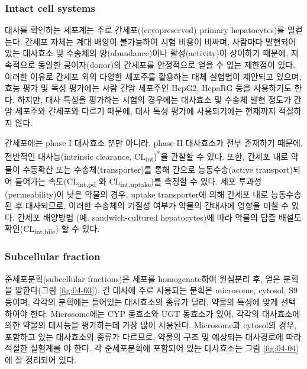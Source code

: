 \documentclass[
  11pt,
  krantz2, a4paper, twoside]{krantz}
\begin{document}
\subsubsection{Intact cell systems}\label{intact-cell-systems}

대사를 확인하는 세포계는 주로 간세포((cryopreserved) primary
hepatocytes)를 일컫는다. 간세포 자체는 계대 배양이 불가능하여 시험
비용이 비싸며, 사람마다 발현되어 있는 대사효소 및 수송체의
양(abundance)이나 활성(activity)이 상이하기 때문에, 지속적으로 동일한
공여자(donor)의 간세포를 안정적으로 얻을 수 없는 제한점이 있다. 이러한
이유로 간세포 외의 다양한 세포주를 활용하는 대체 실험법이 제안되고
있으며, 효능 평가 및 독성 평가에는 사람 간암 세포주인 HepG2, HepaRG 등을
사용하기도 한다. 하지만, 대사 특성을 평가하는 시험의 경우에는 대사효소
및 수송체 발현 정도가 간암 세포주와 간세포와 다르기 때문에, 대사 특성
평가에 사용되기에는 현재까지 적절하지 않다.

간세포에는 phase I 대사효소 뿐만 아니라, phase II 대사효소가 전부
존재하기 때문에, 전반적인 대사능(intrinsic clearance, CL\textsubscript{int})\textsuperscript{*}을
관찰할 수 있다. 또한, 간세포 내로 약물이 수동확산 또는
수송체(transporter)를 통해 간으로 능동수송(active transport)되어
들어가는 속도(CL\textsubscript{int,pd} 와 CL\textsubscript{int,uptake})를 측정할 수 있다. 세포
투과성(permeability)이 낮은 약물의 경우, uptake transporter에 의해
간세포 내로 능동수송 된 후 대사되므로, 이러한 수송체의 기질성 여부가
약물의 간대사에 영향을 미칠 수 있다. 간세포 배양방법 (예.
sandwich-cultured hepatocytes)에 따라 약물의 담즙 배설도
확인(CL\textsubscript{int,bile}) 할 수 있다.

\subsubsection{Subcellular fraction}\label{subcellular-fraction}

준세포분획(subcellular fractions)은 세포를 homogenate하여 원심분리 후,
얻은 분획을 말한다(그림 \ref{fig:04-03}). 간 대사에 주로 사용되는 분획은 microsome,
cytosol, S9 등이며, 각각의 분획에는 들어있는 대사효소의 종류가 달라,
약물의 특성에 맞게 선택하여야 한다. Microsome에는 CYP 동효소와 UGT
동효소가 있어, 각각의 대사효소에 의한 약물의 대사능을 평가하는데 가장
많이 사용된다. Microsome과 cytosol의 경우, 포함하고 있는 대사효소의
종류가 다르므로, 약물의 구조 및 예상되는 대사경로에 따라 적절한 실험계를 야 한다. 각 준세포분획에 포함되어 있는 대사효소는 그림 \ref{fig:04-04}에 잘
정리되어 있다.
\end{document}
